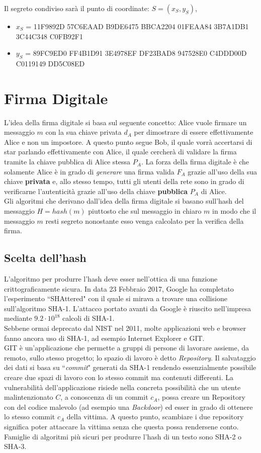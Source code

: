 \documentclass[a4paper,12pt]{tesiinfo}
\begin{document}
Il segreto condiviso sar\`a il punto di coordinate: $S = (x_S, y_S)$,
\begin{itemize}
    \item $x_S$ = 11F9892D 57C6EAAD B9DE6475 BBCA2204 01FEAA84 3B7A1DB1 3C44C348 C0FB92F1
    \item $y_S$ = 89FC9ED0 FF4B1D91 3E4978EF DF23BAD8 947528E0 C4DDD00D C0119149 DD5C08ED
\end{itemize}
%
%
%
%
%
%
%
%
%
%
%
\section{Firma Digitale}
L'idea della firma digitale si basa sul seguente concetto: Alice vuole firmare un messaggio $m$ con la sua chiave privata $d_A$ per dimostrare di essere effettivamente Alice e non un impostore. A questo punto segue Bob, il quale vorr\`a accertarsi di star parlando effettivamente con Alice, il quale cercher\`a di validare la firma tramite la chiave pubblica di Alice stessa $P_A$. La forza della firma digitale \`e che solamente Alice \`e in grado di \textit{generare} una firma valida $F_A$ grazie all'uso della sua chiave \textbf{privata} e, allo stesso tempo, tutti gli utenti della rete sono in grado di verificarne l'autenticit\`a grazie all'uso della chiave \textbf{pubblica} $P_A$ di Alice.
\\
Gli algoritmi che derivano dall'idea della firma digitale si basano sull'hash del messaggio $H = hash(m)$ piuttosto che sul messaggio in chiaro $m$ in modo che il messaggio $m$ resti segreto nonostante esso venga calcolato per la verifica della firma.
%
%
%
%
%
%
%
%
%
%
\subsection{Scelta dell'hash}
L'algoritmo per produrre l'hash deve esser nell'ottica di una funzione crittograficamente sicura. In data 23 Febbraio 2017, Google ha completato l'esperimento ``SHAttered" \cite{Shattered} con il quale si mirava a trovare una collisione sull'algoritmo SHA-1. L'attacco portato avanti da Google \`e riuscito nell'impresa mediante $9.2\cdot 10^{18}$ calcoli di SHA-1.
\\
Sebbene ormai deprecato dal NIST nel 2011, molte applicazioni web e browser fanno ancora uso di SHA-1, ad esempio Internet Explorer e GIT.
\\
GIT \`e un'applicazione che permette a gruppi di persone di lavorare assieme, da remoto, sullo stesso progetto; lo spazio di lavoro \`e detto \textit{Repository}. Il salvataggio dei dati si basa su ``\textit{commit}" generati da SHA-1 rendendo essenzialmente possibile creare due spazi di lavoro con lo stesso commit ma contenuti differenti. La vulnerabilit\`a dell'applicazione risiede nella concreta possibilit\`a che un utente malintenzionato $C$, a conoscenza di un commit $c_A$, possa creare un Repository con del codice malevolo (ad esempio una \textit{Backdoor}) ed esser in grado di ottenere lo stesso commit $c_A$ della vittima. A questo punto, scambiare i due repository significa poter attaccare la vittima senza che questa possa rendersene conto. 
\\
Famiglie di algoritmi pi\`u sicuri per produrre l'hash di un testo sono SHA-2 o SHA-3. 
%
%
%
%
%
%
%
%
%
%
%
%
%
\end{document}
